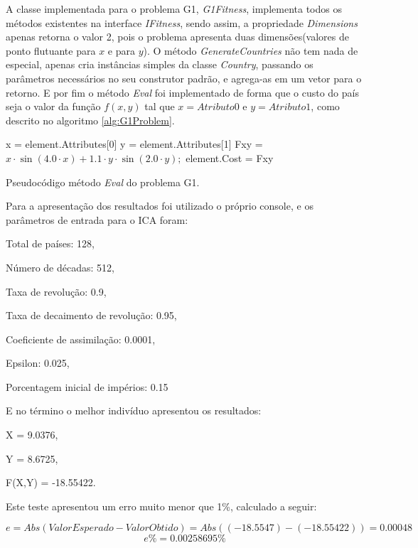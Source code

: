 A classe implementada para o problema G1, \emph{G1Fitness}, implementa todos os métodos existentes na interface \emph{IFitness}, sendo assim, a propriedade \emph{Dimensions} apenas retorna o valor 2, pois o problema apresenta duas dimensões(valores de ponto flutuante para \(x\) e para \(y\)). O método \emph{GenerateCountries} não tem nada de especial, apenas cria instâncias simples da classe \emph{Country}, passando os parâmetros necessários no seu construtor padrão, e agrega-as em um vetor para o retorno. E por fim o método \emph{Eval} foi implementado de forma que o custo do país seja o valor da função \(f(x,y)\) tal que \(x = Atributo0\) e \(y = Atributo1\), como descrito no algoritmo \ref{alg:G1Problem}.

\vspace{10px}
\begin{algorithm}[h]
\SetAlgoLined
{}
x = element.Attributes[0]\;
y = element.Attributes[1]\;
Fxy =\( x \cdot \sin(4.0 \cdot x) + 1.1 \cdot y \cdot \sin(2.0 \cdot y);\)\;
element.Cost = Fxy\;
\caption{ Pseudocódigo método \emph{Eval} do problema G1.}
\label{alg:G1Problem}
\end{algorithm}
\vspace{10px}

Para a apresentação dos resultados foi utilizado o próprio console, e os parâmetros de entrada para o ICA foram: 

Total de países: 128, 

Número de décadas: 512, 

Taxa de revolução: 0.9, 

Taxa de decaimento de revolução: 0.95, 

Coeficiente de assimilação: 0.0001, 

Epsilon: 0.025,

Porcentagem inicial de impérios: 0.15

E no término o melhor indivíduo apresentou os resultados: 

X = 9.0376,

Y = 8.6725,

F(X,Y) = -18.55422.

Este teste apresentou um erro muito menor que 1\%, calculado a seguir: 

\[
e = Abs(Valor Esperado - Valor Obtido ) = Abs((-18.5547) - (-18.55422)) = 0.00048
\]
\[
e\%= 0.00258695\%
\]


